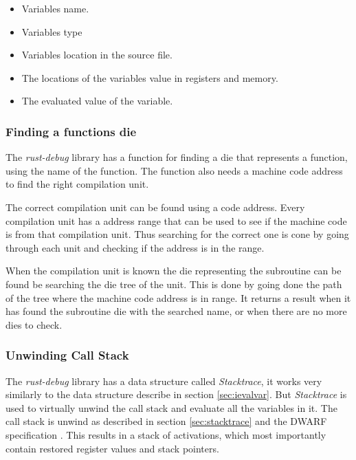 \begin{itemize}
  \item Variables name.
  \item Variables type
  \item Variables location in the source file.
  \item The locations of the variables value in registers and memory.
  \item The evaluated value of the variable.
\end{itemize}


\subsubsection{Finding a functions \gls{die}} \label{sec:funcdie}
The \emph{rust-debug} library has a function for finding a \gls{die} that represents a function, using the name of the function.
The function also needs a machine code address to find the right compilation unit.


The correct compilation unit can be found using a code address.
Every compilation unit has a address range that can be used to see if the machine code is from that compilation unit.
Thus searching for the correct one is cone by going through each unit and checking if the address is in the range.


When the compilation unit is known the \gls{die} representing the subroutine can be found be searching the \gls{die} tree of the unit.
This is done by going done the path of the tree where the machine code address is in range.
It returns a result when it has found the subroutine \gls{die} with the searched name, or when there are no more \glspl{die} to check.


\subsubsection{Unwinding Call Stack}
The \emph{rust-debug} library has a data structure called \emph{Stacktrace}, it works very similarly to the data structure describe in section \ref{sec:ievalvar}.
But \emph{Stacktrace} is used to virtually unwind the call stack and evaluate all the variables in it.
The call stack is unwind as described in section \ref{sec:stacktrace} and the \gls{DWARF} specification \cite{dwarf}.
This results in a stack of activations, which most importantly contain restored register values and stack pointers.


